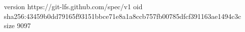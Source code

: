 version https://git-lfs.github.com/spec/v1
oid sha256:43459b0dd79165f93151bbce71e8a1a8ccb757fb00785dfcf391163ae1494c3c
size 9097
